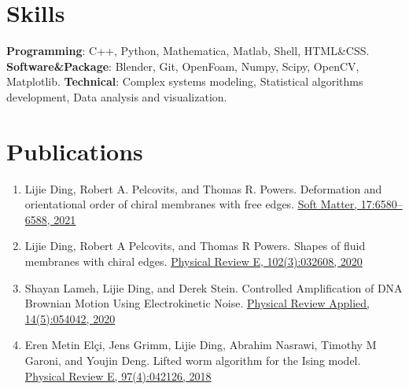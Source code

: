 \documentclass[11pt,letterpaper]{article}
\begin{document}
\section*{Skills}
\vspace*{-0.1in}
\textbf{Programming}: C++, Python, Mathematica, Matlab, Shell, HTML\&CSS. \newline
\textbf{Software\&Package}: Blender, Git, OpenFoam, Numpy, Scipy, OpenCV, Matplotlib. \newline
\textbf{Technical}: Complex systems modeling, Statistical algorithms development, Data analysis and visualization.

\section*{Publications}
\vspace*{-0.1in}
\begin{enumerate}
    \item Lijie Ding, Robert A. Pelcovits, and Thomas R. Powers. Deformation and orientational order of chiral membranes with free edges. \href{https://pubs.rsc.org/en/content/articlehtml/2021/sm/d1sm00629k}{Soft Matter, 17:6580–6588, 2021}
    \item Lijie Ding, Robert A Pelcovits, and Thomas R Powers. Shapes of fluid membranes with chiral edges. \href{https://journals.aps.org/pre/abstract/10.1103/PhysRevE.102.032608}{Physical Review E, 102(3):032608, 2020}
    \item Shayan Lameh, Lijie Ding, and Derek Stein. Controlled Amplification of DNA Brownian Motion Using Electrokinetic Noise. \href{https://journals.aps.org/prapplied/abstract/10.1103/PhysRevApplied.14.054042}{Physical Review Applied, 14(5):054042, 2020}
    \item Eren Metin Elçi, Jens Grimm, Lijie Ding, Abrahim Nasrawi, Timothy M Garoni, and Youjin Deng. Lifted worm algorithm for the Ising model. \href{https://journals.aps.org/pre/abstract/10.1103/PhysRevE.97.042126}{Physical Review E, 97(4):042126, 2018}
\end{enumerate}

\end{document}
